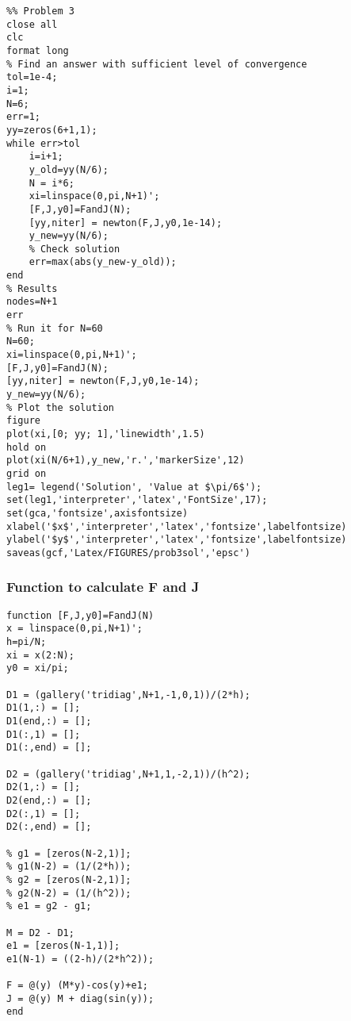 \begin{verbatim}
%% Problem 3
close all
clc
format long
% Find an answer with sufficient level of convergence
tol=1e-4;
i=1;
N=6;
err=1;
yy=zeros(6+1,1);
while err>tol
    i=i+1;
    y_old=yy(N/6);
    N = i*6;
    xi=linspace(0,pi,N+1)';
    [F,J,y0]=FandJ(N);
    [yy,niter] = newton(F,J,y0,1e-14);
    y_new=yy(N/6);
    % Check solution
    err=max(abs(y_new-y_old));
end
% Results
nodes=N+1
err
% Run it for N=60
N=60;
xi=linspace(0,pi,N+1)';
[F,J,y0]=FandJ(N);
[yy,niter] = newton(F,J,y0,1e-14);
y_new=yy(N/6);
% Plot the solution
figure
plot(xi,[0; yy; 1],'linewidth',1.5)
hold on
plot(xi(N/6+1),y_new,'r.','markerSize',12)
grid on
leg1= legend('Solution', 'Value at $\pi/6$');
set(leg1,'interpreter','latex','FontSize',17);
set(gca,'fontsize',axisfontsize)
xlabel('$x$','interpreter','latex','fontsize',labelfontsize)
ylabel('$y$','interpreter','latex','fontsize',labelfontsize)
saveas(gcf,'Latex/FIGURES/prob3sol','epsc')
\end{verbatim}
\subsubsection*{Function to calculate F and J}
\begin{verbatim}
function [F,J,y0]=FandJ(N)
x = linspace(0,pi,N+1)';
h=pi/N;
xi = x(2:N);
y0 = xi/pi;

D1 = (gallery('tridiag',N+1,-1,0,1))/(2*h);
D1(1,:) = [];
D1(end,:) = [];
D1(:,1) = [];
D1(:,end) = [];

D2 = (gallery('tridiag',N+1,1,-2,1))/(h^2);
D2(1,:) = [];
D2(end,:) = [];
D2(:,1) = [];
D2(:,end) = [];

% g1 = [zeros(N-2,1)];
% g1(N-2) = (1/(2*h));
% g2 = [zeros(N-2,1)];
% g2(N-2) = (1/(h^2));
% e1 = g2 - g1;

M = D2 - D1;
e1 = [zeros(N-1,1)];
e1(N-1) = ((2-h)/(2*h^2));

F = @(y) (M*y)-cos(y)+e1;
J = @(y) M + diag(sin(y));
end
\end{verbatim}